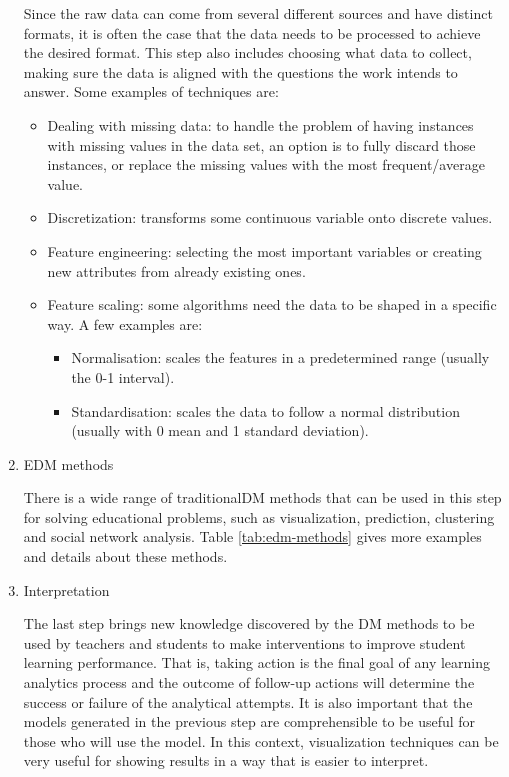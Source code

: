 \begin{enumerate}
    Since the raw data can come from several different sources and have distinct formats, it is often the case that the data needs to be processed to achieve the desired format. This step also includes choosing what data to collect, making sure the data is aligned with the questions the work intends to answer. Some examples of techniques are: 
    \begin{itemize}
        \item Dealing with missing data: to handle the problem of having instances with missing values in the data set, an option is to fully discard those instances, or replace the missing values with the most frequent/average value.
        \item Discretization: transforms some continuous variable onto discrete values.
        \item Feature engineering: selecting the most important variables or creating new attributes from already existing ones.
        \item Feature scaling: some algorithms need the data to be shaped in a specific way. A few examples are:
        \begin{itemize}
            \item Normalisation: scales the features in a predetermined range (usually the 0-1 interval).
            \item Standardisation: scales the data to follow a normal distribution (usually with 0 mean and 1 standard deviation).
        \end{itemize}
    \end{itemize}
    
    \item EDM methods
    
    There is a wide range of traditionalDM methods that can be used in this step for solving educational problems, such as visualization, prediction, clustering and social network analysis. Table \ref{tab:edm-methods} gives more examples and details about these methods.
    
    \item Interpretation
    
    The last step brings new knowledge discovered by the DM methods to be used by teachers and students to make interventions to improve student learning performance. That is, taking action is the final goal of any learning analytics process and the outcome of follow-up actions will determine the success or failure of the analytical attempts. It is also important that the models generated in the previous step are comprehensible to be useful for those who will use the model. In this context, visualization techniques can be very useful for showing results in a way that is easier to interpret.
\end{enumerate}

